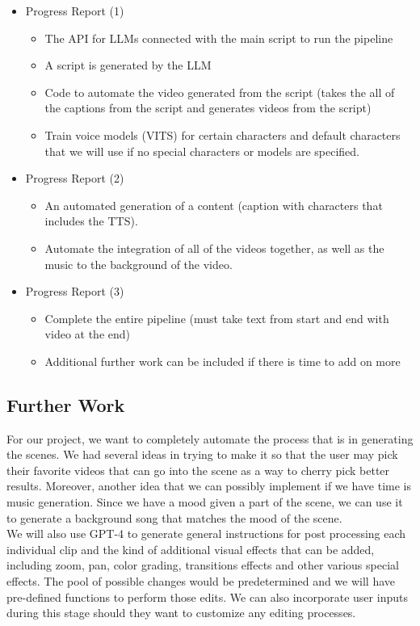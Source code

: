 \documentclass[conference]{IEEEtran}
\begin{document}
\begin{itemize}
    \item Progress Report (1)
    \begin{itemize}
        \item The API for LLMs connected with the main script to run the pipeline
        \item A script is generated by the LLM
        \item Code to automate the video generated from the script (takes the all of the captions from the script and generates videos from the script)
        \item Train voice models (VITS) for certain characters and default characters that we will use if no special characters or models are specified.
    \end{itemize}
    \item Progress Report (2)
    \begin{itemize}
        \item An automated generation of a content (caption with characters that includes the TTS). 
        \item Automate the integration of all of the videos together, as well as the music to the background of the video.
    \end{itemize}
    \item Progress Report (3)
    \begin{itemize}
        \item Complete the entire pipeline (must take text from start and end with video at the end)
        \item Additional further work can be included if there is time to add on more
    \end{itemize}
\end{itemize}
\subsection{Further Work}
For our project, we want to completely automate the process that is in generating the scenes. We had several ideas in trying to make it so that the user may pick their favorite videos that can go into the scene as a way to cherry pick better results. Moreover, another idea that we can possibly implement if we have time is music generation. Since we have a mood given a part of the scene, we can use it to generate a background song that matches the mood of the scene. \\
\indent We will also use GPT-4 to generate general instructions for post processing each individual clip and the kind of additional visual effects that can be added, including zoom, pan, color grading, transitions effects and other various special effects. The pool of possible changes would be predetermined and we will have pre-defined functions to perform those edits. We can also incorporate user inputs during this stage should they want to customize any editing processes.
\end{document}
